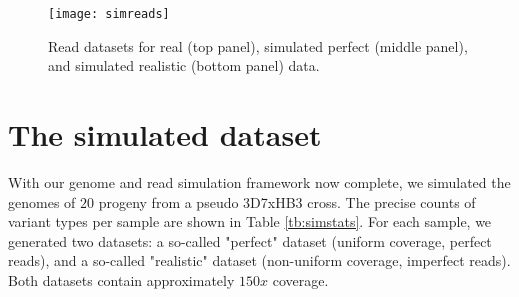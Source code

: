 \begin{sidewaysfigure}[h!]
  \centering
    \texttt{[image: simreads]}
  \caption{Read datasets for real (top panel), simulated perfect (middle panel), and simulated realistic (bottom panel) data.}
  \label{fig:simreads}
\end{sidewaysfigure}

\section{The simulated dataset}

With our genome and read simulation framework now complete, we simulated the genomes of $20$ progeny from a pseudo 3D7xHB3 cross.  The precise counts of variant types per sample are shown in Table \ref{tb:simstats}.  For each sample, we generated two datasets: a so-called "perfect" dataset (uniform coverage, perfect reads), and a so-called "realistic" dataset (non-uniform coverage, imperfect reads).  Both datasets contain approximately $150x$ coverage.

